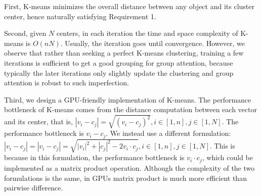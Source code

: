 \begin{sloppypar}
First, K-means minimizes the overall distance between any object and its cluster center, hence naturally satisfying Requirement 1. 

Second, given $N$ centers, in each iteration the time and space complexity of K-means is $O(nN)$. Usually, the iteration goes until convergence. However, we observe that rather than seeking a perfect K-means clustering, training a few iterations is sufficient to get a good grouping for group attention, because typically the later iterations only slightly update the clustering and group attention is robust to such imperfection. 

Third, we design a GPU-friendly implementation of K-means. The performance bottleneck of K-means comes from the distance computation between each vector and its center, that is, $\mathit{|v_i-c_j|=\sqrt{(v_i-c_j)^2}, i\in [1,n], j\in [1,N]}$. The performance bottleneck is $v_i-c_j$.
We instead use a different formulation: $|v_i-c_j|=\mathit{|v_i-c_j|=\sqrt{|v_i|^2+|c_j|^2-2 v_i \cdot c_j}, i\in [1,n], j\in [1,N]}$.
This is because in this formulation, the performance bottleneck is $v_i \cdot c_j$, which could be implemented as a matrix product operation.
Although the complexity of the two formulations is the same, in GPUs matrix product is much more efficient than pairwise difference.








\end{sloppypar}